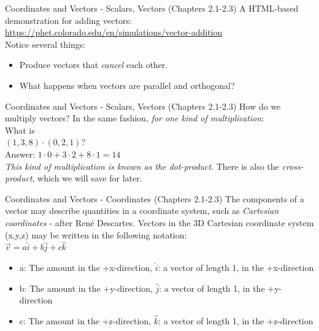 \documentclass{beamer}
\begin{document}
\begin{frame}{Coordinates and Vectors - Scalars, Vectors (Chapters 2.1-2.3)}
A HTML-based demonstration for adding vectors: \\
\vspace{0.5cm}
\url{https://phet.colorado.edu/en/simulations/vector-addition}
\vspace{0.5cm} \\
Notice several things:
\begin{itemize}
\item Produce vectors that \textit{cancel} each other.
\item What happens when vectors are parallel and orthogonal?
\end{itemize}
\end{frame}

\begin{frame}{Coordinates and Vectors - Scalars, Vectors (Chapters 2.1-2.3)}
How do we multiply vectors? In the same fashion, \textit{for one kind of multiplication}:\\
\vspace{0.5cm}
What is\\
$(1,3,8)\cdot (0,2,1)$? \\
Answer: $1\cdot 0 + 3 \cdot 2 + 8 \cdot 1 = 14$ \\
\vspace{0.5cm}
\textit{This kind of multiplication is known as the dot-product}.  There is also the \textit{cross-product}, which we will save for later.
\end{frame}

\begin{frame}{Coordinates and Vectors - Coordinates (Chapters 2.1-2.3)}
\small
The components of a vector may describe quantities in a \alert{coordinate system}, such as \textit{Cartesian coordinates} - after Ren\'e Descartes.  Vectors in the 3D Cartesian coordinate system (x,y,z) may be written in the following notation:
\\
\vspace{0.2cm}
$\boxed{\vec{v} = a\hat{i} + b\hat{j} + c\hat{k}}$
\\
\begin{itemize}
\item a: The amount in the +x-direction, $\hat{i}$: a vector of length 1, in the +x-direction
\item b: The amount in the +y-direction, $\hat{j}$: a vector of length 1, in the +y-direction
\item c: The amount in the +z-direction, $\hat{k}$: a vector of length 1, in the +z-direction
\end{itemize}
\end{frame}
\end{document}
